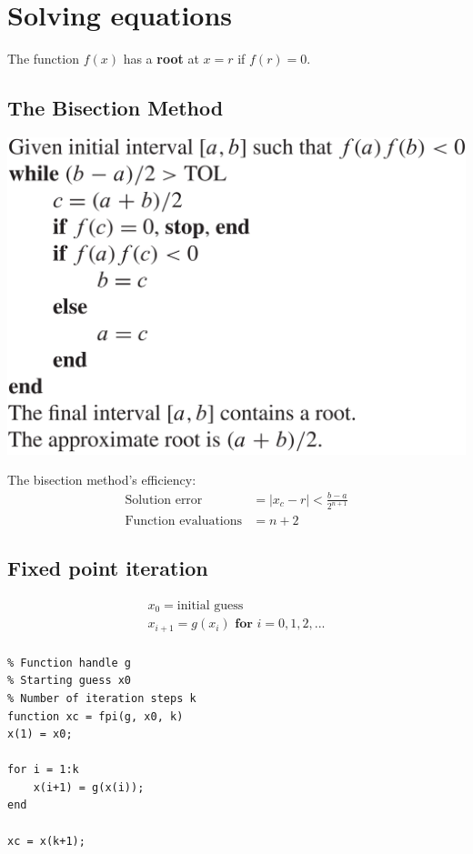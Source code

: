 \section{Solving equations}
\begin{definition}
The function $f(x)$ has a \textbf{root} at $x = r$ if $f(r) = 0$.
\end{definition}

\subsection{The Bisection Method}
\includegraphics[scale=0.17]{images/bisection_method.png}
    
The bisection method's efficiency:
\begin{align*}
\text{Solution error} & = |x_c - r| < \frac{b-a}{2^{n+1}} \\
\text{Function evaluations} & = n + 2
\end{align*}
\subsection{Fixed point iteration}
\begin{gather*}
x_0 = \text{initial guess} \\
x_{i+1} = g(x_i) \textbf{ for } i = 0,1,2,... \\
\end{gather*}
\begin{lstlisting}
% Function handle g
% Starting guess x0
% Number of iteration steps k
function xc = fpi(g, x0, k)
x(1) = x0;

for i = 1:k
    x(i+1) = g(x(i));
end

xc = x(k+1);
\end{lstlisting}

